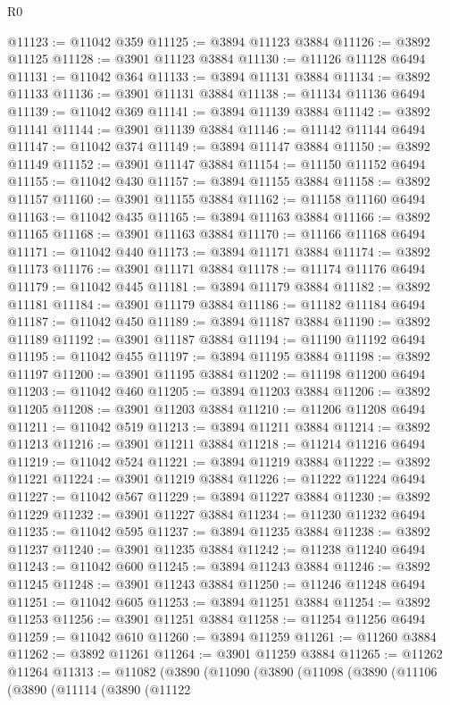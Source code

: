 \begin{lexlean}{R0}
\begin{coremodule}
@11123 := @11042 @359
@11125 := @3894 @11123 @3884
@11126 := @3892 @11125
@11128 := @3901 @11123 @3884
@11130 := @11126 @11128 @6494
@11131 := @11042 @364
@11133 := @3894 @11131 @3884
@11134 := @3892 @11133
@11136 := @3901 @11131 @3884
@11138 := @11134 @11136 @6494
@11139 := @11042 @369
@11141 := @3894 @11139 @3884
@11142 := @3892 @11141
@11144 := @3901 @11139 @3884
@11146 := @11142 @11144 @6494
@11147 := @11042 @374
@11149 := @3894 @11147 @3884
@11150 := @3892 @11149
@11152 := @3901 @11147 @3884
@11154 := @11150 @11152 @6494
@11155 := @11042 @430
@11157 := @3894 @11155 @3884
@11158 := @3892 @11157
@11160 := @3901 @11155 @3884
@11162 := @11158 @11160 @6494
@11163 := @11042 @435
@11165 := @3894 @11163 @3884
@11166 := @3892 @11165
@11168 := @3901 @11163 @3884
@11170 := @11166 @11168 @6494
@11171 := @11042 @440
@11173 := @3894 @11171 @3884
@11174 := @3892 @11173
@11176 := @3901 @11171 @3884
@11178 := @11174 @11176 @6494
@11179 := @11042 @445
@11181 := @3894 @11179 @3884
@11182 := @3892 @11181
@11184 := @3901 @11179 @3884
@11186 := @11182 @11184 @6494
@11187 := @11042 @450
@11189 := @3894 @11187 @3884
@11190 := @3892 @11189
@11192 := @3901 @11187 @3884
@11194 := @11190 @11192 @6494
@11195 := @11042 @455
@11197 := @3894 @11195 @3884
@11198 := @3892 @11197
@11200 := @3901 @11195 @3884
@11202 := @11198 @11200 @6494
@11203 := @11042 @460
@11205 := @3894 @11203 @3884
@11206 := @3892 @11205
@11208 := @3901 @11203 @3884
@11210 := @11206 @11208 @6494
@11211 := @11042 @519
@11213 := @3894 @11211 @3884
@11214 := @3892 @11213
@11216 := @3901 @11211 @3884
@11218 := @11214 @11216 @6494
@11219 := @11042 @524
@11221 := @3894 @11219 @3884
@11222 := @3892 @11221
@11224 := @3901 @11219 @3884
@11226 := @11222 @11224 @6494
@11227 := @11042 @567
@11229 := @3894 @11227 @3884
@11230 := @3892 @11229
@11232 := @3901 @11227 @3884
@11234 := @11230 @11232 @6494
@11235 := @11042 @595
@11237 := @3894 @11235 @3884
@11238 := @3892 @11237
@11240 := @3901 @11235 @3884
@11242 := @11238 @11240 @6494
@11243 := @11042 @600
@11245 := @3894 @11243 @3884
@11246 := @3892 @11245
@11248 := @3901 @11243 @3884
@11250 := @11246 @11248 @6494
@11251 := @11042 @605
@11253 := @3894 @11251 @3884
@11254 := @3892 @11253
@11256 := @3901 @11251 @3884
@11258 := @11254 @11256 @6494
@11259 := @11042 @610
@11260 := @3894 @11259
@11261 := @11260 @3884
@11262 := @3892 @11261
@11264 := @3901 @11259 @3884
@11265 := @11262 @11264
@11313 := @11082
    (@3890
      (@11090
        (@3890
          (@11098
            (@3890
              (@11106
                (@3890
                  (@11114
                    (@3890
                      (@11122

\end{coremodule}
\end{lexlean}
